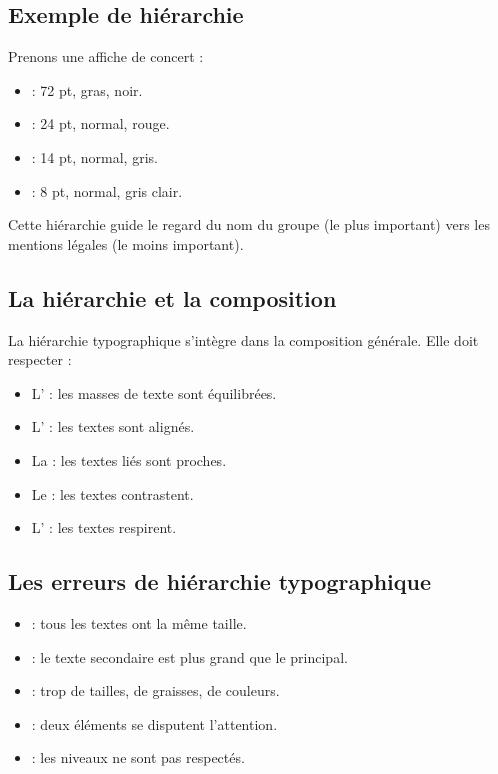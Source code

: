 \subsection{Exemple de hiérarchie}

Prenons une affiche de concert :

\begin{itemize}
    \item {} : 72 pt, gras, noir.
    \item {} : 24 pt, normal, rouge.
    \item {} : 14 pt, normal, gris.
    \item {} : 8 pt, normal, gris clair.
\end{itemize}

Cette hiérarchie guide le regard du nom du groupe (le plus important) vers les mentions légales (le moins important).

\subsection{La hiérarchie et la composition}

La hiérarchie typographique s'intègre dans la composition générale. Elle doit respecter :

\begin{itemize}
    \item L' : les masses de texte sont équilibrées.
    \item L' : les textes sont alignés.
    \item La  : les textes liés sont proches.
    \item Le  : les textes contrastent.
    \item L' : les textes respirent.
\end{itemize}

\subsection{Les erreurs de hiérarchie typographique}

\begin{itemize}
    \item {} : tous les textes ont la même taille.
    \item {} : le texte secondaire est plus grand que le principal.
    \item {} : trop de tailles, de graisses, de couleurs.
    \item {} : deux éléments se disputent l'attention.
    \item {} : les niveaux ne sont pas respectés.
\end{itemize}

